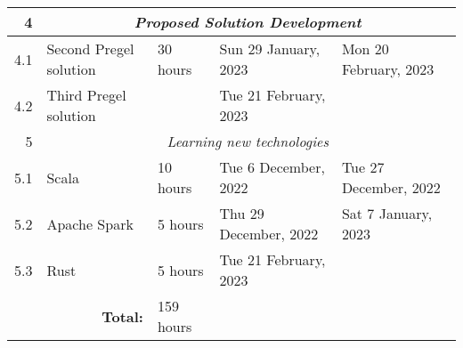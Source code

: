 \documentclass{standalone}
\begin{document}
\begin{tabular}{|r|llll|}
    4                                                             & \multicolumn{4}{c|}{\textit{Proposed Solution Development}}                                                                                                                                                                                                   \\ \hline
    4.1                                                           & \multicolumn{1}{l|}{Second Pregel solution}                     & \multicolumn{1}{l|}{30 hours}                                  & \multicolumn{1}{l|}{Sun 29 January, 2023}                   & Mon 20 February, 2023                                        \\ \hline
    4.2                                                           & \multicolumn{1}{l|}{Third Pregel solution}                      & \multicolumn{1}{l|}{}                                          & \multicolumn{1}{l|}{Tue 21 February, 2023}                  &                                                              \\ \hline
    5                                                             & \multicolumn{4}{c|}{\textit{Learning new technologies}}                                                                                                                                                                                                       \\ \hline
    5.1                                                           & \multicolumn{1}{l|}{Scala}                                      & \multicolumn{1}{l|}{10 hours}                                  & \multicolumn{1}{l|}{Tue 6 December, 2022}                   & Tue 27 December, 2022                                        \\ \hline
    5.2                                                           & \multicolumn{1}{l|}{Apache Spark}                               & \multicolumn{1}{l|}{5 hours}                                   & \multicolumn{1}{l|}{Thu 29 December, 2022}                  & Sat 7 January, 2023                                          \\ \hline
    5.3                                                           & \multicolumn{1}{l|}{Rust}                                       & \multicolumn{1}{l|}{5 hours}                                   & \multicolumn{1}{l|}{Tue 21 February, 2023}                  &                                                              \\ \hline
    \multicolumn{2}{|r|}{\cellcolor[HTML]{C0C0C0}\textbf{Total:}} & \multicolumn{1}{l|}{159 hours}                                                                                                                                                                                                                                \\ \cline{1-3}
\end{tabular}
\end{document}
